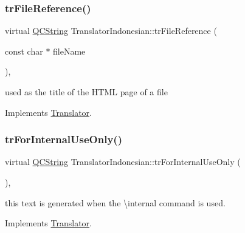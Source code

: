 \mbox{\label{class_translator_indonesian_afef9e18adf3c16c295f13206cdf7f19a}} 
\subsubsection{\texorpdfstring{trFileReference()}{trFileReference()}}
{\footnotesize\ttfamily virtual \mbox{\hyperlink{class_q_c_string}{Q\+C\+String}} Translator\+Indonesian\+::tr\+File\+Reference (\begin{DoxyParamCaption}\item[{const char $\ast$}]{file\+Name }\end{DoxyParamCaption})\hspace{0.3cm}{\ttfamily [inline]}, {\ttfamily [virtual]}}

used as the title of the H\+T\+ML page of a file 

Implements \mbox{\hyperlink{class_translator}{Translator}}.

\mbox{\label{class_translator_indonesian_a03552820653b4855b3f2200a960be161}} 
\subsubsection{\texorpdfstring{trForInternalUseOnly()}{trForInternalUseOnly()}}
{\footnotesize\ttfamily virtual \mbox{\hyperlink{class_q_c_string}{Q\+C\+String}} Translator\+Indonesian\+::tr\+For\+Internal\+Use\+Only (\begin{DoxyParamCaption}{ }\end{DoxyParamCaption})\hspace{0.3cm}{\ttfamily [inline]}, {\ttfamily [virtual]}}

this text is generated when the \textbackslash{}internal command is used. 

Implements \mbox{\hyperlink{class_translator}{Translator}}.

\mbox{\label{class_translator_indonesian_ae711934342f075ab4b90443ec774476c}} 

